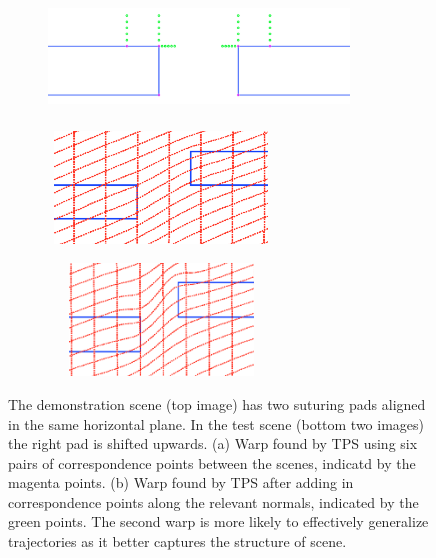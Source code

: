 
\begin{figure}[h!]
\centering
\begin{subfigure}[b]{0.9\textwidth}
\centering
\hspace{-0.7cm}
\includegraphics[width=8cm, height=3cm]{normals_points}
\end{subfigure}
\begin{subfigure}[b]{0.4\textwidth}
\includegraphics[width=6cm, height=3cm]{TPS_withoutnormals}
\caption{}
\end{subfigure}
\hspace{0.02\textwidth}
\begin{subfigure}[b]{0.4\textwidth}
\includegraphics[width=6cm, height=3cm]{TPS_withnormals}
\caption{}
\end{subfigure}
\caption{The demonstration scene (top image) has two suturing pads aligned in the same horizontal plane. In the test scene (bottom two images) the right pad is shifted upwards. (a) Warp found by TPS using six pairs of correspondence points between the scenes, indicatd by the magenta points. (b) Warp found by TPS after adding in correspondence points along the relevant normals, indicated by the green points. The second warp is more likely to effectively generalize trajectories as it better captures the structure of scene.}
\label{fig:normals}
\end{figure}
